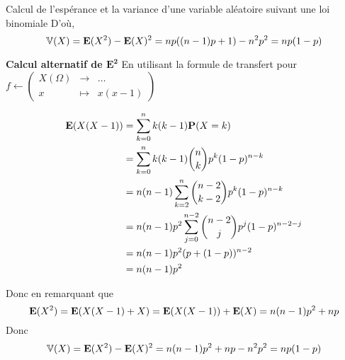 \documentclass{article}
\begin{document}
\begin{question_kholle}{Calcul de l'espérance et la variance d'une variable aléatoire suivant une loi binomiale}
	D'où,
	$$
	\mathbb V(X) = \mathbf E(X^{2}) - \mathbf E(X)^{2}=np((n-1)p+1)- n^{2} p ^{2}=np(1-p)
	$$
	
	\textbf{Calcul alternatif de $\mathbf{E^2}$} En utilisant la formule de transfert pour $f \leftarrow \left( \begin{matrix}
		X(\Omega) &\to &\dots \\
		x &\mapsto &x(x-1)
	\end{matrix} \right)$
	
	
	\begin{align*}
		\mathbf E(X(X - 1)) &= \sum_{k=0}^{n}k(k-1)\mathbf P(X=k) \\
		&= \sum_{k=0}^{n}k(k-1)\binom{n}{k}p^{k}(1-p)^{n-k} \\
		&= n(n-1) \sum_{k=2}^{n}\binom{n-2}{k-2}p^{k}(1-p)^{n-k} \\
		&= n(n-1)p^{2} \sum_{j=0}^{n-2} \binom{n-2}{j}p^{j}(1-p)^{n-2-j} \\
		&= n(n-1) p^{2} (p + (1-p))^{n-2} \\
		&= n(n-1)p^{2}
	\end{align*}
	
	Donc en remarquant que $$\mathbf E(X^{2}) = \mathbf E(X(X-1)+X) = \mathbf E(X(X-1))+\mathbf E(X)= n(n-1)p^{2} + np$$
	Donc
	$$\mathbb V(X) = \mathbf E(X^{2})- \mathbf E(X)^{2} = n(n-1)p^{2} + np - n^{2}p^{2} = np(1-p)$$
	
	
\end{question_kholle}
\end{document}
